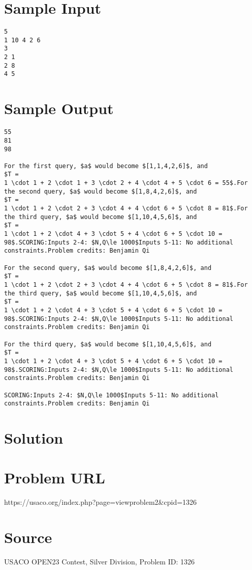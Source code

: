 \documentclass[12pt]{article}
\begin{document}
\section*{Sample Input}
\begin{verbatim}
5
1 10 4 2 6
3
2 1
2 8
4 5
\end{verbatim}

\section*{Sample Output}
\begin{verbatim}
55
81
98

For the first query, $a$ would become $[1,1,4,2,6]$, and
$T =
1 \cdot 1 + 2 \cdot 1 + 3 \cdot 2 + 4 \cdot 4 + 5 \cdot 6 = 55$.For the second query, $a$ would become $[1,8,4,2,6]$, and
$T =
1 \cdot 1 + 2 \cdot 2 + 3 \cdot 4 + 4 \cdot 6 + 5 \cdot 8 = 81$.For the third query, $a$ would become $[1,10,4,5,6]$, and
$T =
1 \cdot 1 + 2 \cdot 4 + 3 \cdot 5 + 4 \cdot 6 + 5 \cdot 10 = 98$.SCORING:Inputs 2-4: $N,Q\le 1000$Inputs 5-11: No additional
constraints.Problem credits: Benjamin Qi

For the second query, $a$ would become $[1,8,4,2,6]$, and
$T =
1 \cdot 1 + 2 \cdot 2 + 3 \cdot 4 + 4 \cdot 6 + 5 \cdot 8 = 81$.For the third query, $a$ would become $[1,10,4,5,6]$, and
$T =
1 \cdot 1 + 2 \cdot 4 + 3 \cdot 5 + 4 \cdot 6 + 5 \cdot 10 = 98$.SCORING:Inputs 2-4: $N,Q\le 1000$Inputs 5-11: No additional
constraints.Problem credits: Benjamin Qi

For the third query, $a$ would become $[1,10,4,5,6]$, and
$T =
1 \cdot 1 + 2 \cdot 4 + 3 \cdot 5 + 4 \cdot 6 + 5 \cdot 10 = 98$.SCORING:Inputs 2-4: $N,Q\le 1000$Inputs 5-11: No additional
constraints.Problem credits: Benjamin Qi

SCORING:Inputs 2-4: $N,Q\le 1000$Inputs 5-11: No additional
constraints.Problem credits: Benjamin Qi
\end{verbatim}

\section*{Solution}


\section*{Problem URL}
https://usaco.org/index.php?page=viewproblem2&cpid=1326

\section*{Source}
USACO OPEN23 Contest, Silver Division, Problem ID: 1326
\end{document}
